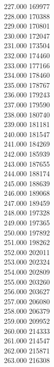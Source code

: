{ 227.000	169977 \\
 228.000	170388 \\
 229.000	170801 \\
 230.000	172047 \\
 231.000	173504 \\
 232.000	174460 \\
 233.000	177166 \\
 234.000	178460 \\
 235.000	178767 \\
 236.000	179243 \\
 237.000	179590 \\
 238.000	180740 \\
 239.000	181181 \\
 240.000	181547 \\
 241.000	184269 \\
 242.000	185939 \\
 243.000	187655 \\
 244.000	188174 \\
 245.000	188639 \\
 246.000	189068 \\
 247.000	189459 \\
 248.000	197328 \\
 249.000	197365 \\
 250.000	197892 \\
 251.000	198262 \\
 252.000	202011 \\
 253.000	202324 \\
 254.000	202809 \\
 255.000	203260 \\
 256.000	203627 \\
 257.000	206080 \\
 258.000	206379 \\
 259.000	209952 \\
 260.000	214333 \\
 261.000	214547 \\
 262.000	215871 \\
 263.000	216308 \\
}
